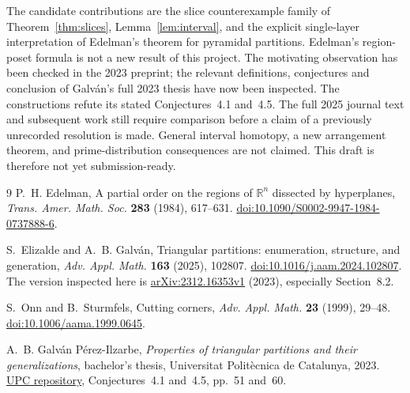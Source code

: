 \documentclass[11pt]{article}
\theoremstyle{remark}
\newcommand{\RR}{\mathbb R}
\begin{document}
The candidate contributions are the slice counterexample family of
Theorem~\ref{thm:slices}, Lemma~\ref{lem:interval}, and the explicit
single-layer interpretation of Edelman's theorem for pyramidal partitions.
Edelman's region-poset formula is not a new result of this project.
The motivating observation has been checked in the 2023 preprint;
the relevant definitions, conjectures and conclusion of Galv\'an's full
2023 thesis have now been inspected. The constructions refute its stated
Conjectures~4.1 and~4.5. The full 2025 journal text and subsequent work still
require comparison before a claim of a previously unrecorded resolution is made.
General interval homotopy, a new arrangement theorem, and prime-distribution
consequences are not claimed.
This draft is therefore not yet submission-ready.

\begin{thebibliography}{9}
P.~H. Edelman,
A partial order on the regions of $\RR^n$ dissected by hyperplanes,
\emph{Trans. Amer. Math. Soc.} \textbf{283} (1984), 617--631.
\href{https://doi.org/10.1090/S0002-9947-1984-0737888-6}{doi:10.1090/S0002-9947-1984-0737888-6}.

S.~Elizalde and A.~B. Galv\'an,
Triangular partitions: enumeration, structure, and generation,
\emph{Adv. Appl. Math.} \textbf{163} (2025), 102807.
\href{https://doi.org/10.1016/j.aam.2024.102807}{doi:10.1016/j.aam.2024.102807}.
The version inspected here is
\href{https://arxiv.org/abs/2312.16353v1}{arXiv:2312.16353v1} (2023),
especially Section~8.2.

S.~Onn and B.~Sturmfels,
Cutting corners,
\emph{Adv. Appl. Math.} \textbf{23} (1999), 29--48.
\href{https://doi.org/10.1006/aama.1999.0645}{doi:10.1006/aama.1999.0645}.

A.~B. Galv\'an P\'erez-Ilzarbe,
\emph{Properties of triangular partitions and their generalizations},
bachelor's thesis, Universitat Polit\`ecnica de Catalunya, 2023.
\href{https://upcommons.upc.edu/entities/publication/99559712-a4e1-46ae-99b3-88546b90b4f3}{UPC repository},
Conjectures~4.1 and~4.5, pp.~51 and~60.
\end{thebibliography}
\end{document}
